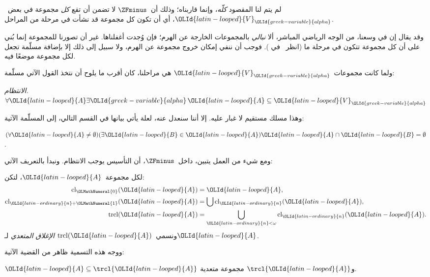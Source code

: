 \documentclass[../../../include/open-logic-section]{subfiles}
\begin{document}


لم يتم لنا المقصود \emph{كلّه}، وإنما قاربناه؛ وذلك أن~$\ZFminus$
لا تضمن أن تقع \emph{كل} مجموعة في بعض~$\OLId{latin-looped}{V}_\OLId{greek-variable}{alpha}$، أي أن تكون كل
مجموعة قد نشأت في مرحلة من المراحل.

وقد يقال إن في وسعنا، من الوجه الرياضي المباشر، ألا \emph{نبالي}
بالمجموعات الخارجة عن الهرم؛ فإن وُجدت أغفلناها. غير أن تصورنا للمجموعة
إنما بُني على أن كل مجموعة تتكون في مرحلة ما (انظر~\stageshier{} في
). فوجب أن ننفي إمكان خروج مجموعة عن الهرم، ولا
سبيل إلى ذلك إلا بإضافة مسلّمة تجعل لكل مجموعة موضعًا فيه.

ولما كانت مجموعات~$\OLId{latin-looped}{V}_\OLId{greek-variable}{alpha}$ هي مراحلنا، كان أقرب ما يلوح أن نتخذ
القول الآتي مسلّمة:

\begin{defish}
\emph{الانتظام.} $\forall \OLId{latin-looped}{A} \exists \OLId{greek-variable}{alpha}\, \OLId{latin-looped}{A} \subseteq \OLId{latin-looped}{V}_\OLId{greek-variable}{alpha}$
\end{defish}

وهذا مسلك مستقيم لا غبار عليه. إلا أننا سنعدل عنه، لعلة يأتي بيانها في
القسم التالي، إلى المسلّمة الآتية:

\begin{axiom}[التأسيس]
$(\forall \OLId{latin-looped}{A} \neq \emptyset)(\exists \OLId{latin-looped}{B} \in \OLId{latin-looped}{A})\OLId{latin-looped}{A} \cap \OLId{latin-looped}{B} = \emptyset$.
\end{axiom}

ومع شيء من العمل يتبين، داخل~$\ZFminus$، أن التأسيس يوجب الانتظام.
ونبدأ بالتعريف الآتي:
\begin{defn}
لكل مجموعة~$\OLId{latin-looped}{A}$، لتكن:
\begin{align*}
	\text{cl}_\OLMathNumeral{0}(\OLId{latin-looped}{A}) &= \OLId{latin-looped}{A},\\
	\text{cl}_{\OLId{latin-ordinary}{n}+\OLMathNumeral{1}}(\OLId{latin-looped}{A}) &= \bigcup \text{cl}_\OLId{latin-ordinary}{n}(\OLId{latin-looped}{A}),\\
	\text{trcl}(\OLId{latin-looped}{A}) &= \bigcup_{\OLId{latin-ordinary}{n} < \omega} \text{cl}_{\OLId{latin-ordinary}{n}}(\OLId{latin-looped}{A}).
\end{align*}
ونسمي~$\text{trcl}(\OLId{latin-looped}{A})$ \emph{الإغلاق المتعدي} لـ$\OLId{latin-looped}{A}$.
\end{defn}
\noindent
ووجه هذه التسمية ظاهر من القضية الآتية:
\begin{prop}
$\OLId{latin-looped}{A} \subseteq \trcl{\OLId{latin-looped}{A}}$ و$\trcl{\OLId{latin-looped}{A}}$ مجموعة متعدية.
\end{prop}
\end{document}

